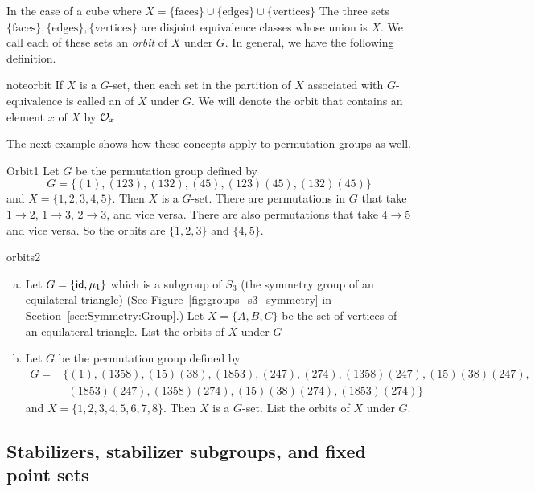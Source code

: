 In the case of a cube where $X=\{\text{faces}\}\cup\{\text{edges}\}\cup\{\text{vertices}\}$ The three sets $\{\text{faces}\},\{\text{edges}\},\{\text{vertices}\}$ are disjoint equivalence classes whose union is $X$. We call each of these sets an \emph{orbit} of $X$ under $G$.  In general, we have the following definition.

\begin{defn}{noteorbit}
If $X$ is a $G$-set, then each set in the partition of $X$ associated with
$G$-equivalence is called an  of $X$ under $G$. We will denote the orbit that contains an element $x$ of $X$ by
${\cal O}_x$. 
\end {defn}
The next example shows how these concepts apply to permutation groups as well.

\begin{example}{Orbit1}
Let $G$ be the permutation group defined by
\[
G =\{(1), (1 23), (1 3 2), (4 5), (1 2 3)(4 5), (1 3 2)(4 5) \}
\]
and $X = \{ 1, 2, 3, 4, 5\}$. Then $X$ is a $G$-set. There are permutations in $G$ that take $1\rightarrow2$, $1\rightarrow3$, $2\rightarrow3$, and vice versa. There are also permutations that take $4\rightarrow 5$ and vice versa.  So the orbits are $\{1, 2, 3\}$ and $\{4, 5\}$. 
\end{example} 
 
\begin{exercise}{orbits2}
\begin{enumerate}[(a)]
\item Let $G=\{\sf{id},\mu_1\}$ which is a subgroup of $S_3$ (the symmetry group of an equilateral triangle) (See Figure~\ref{fig:groups_s3_symmetry} in Section~\ref{sec:Symmetry:Group}.) Let $X=\{A,B,C\}$ be the set of vertices of an equilateral triangle. List the orbits of $X$ under $G$
\item Let $G$ be the permutation group defined by
\begin{align*}
G =&\{(1), (1358),(15)(38), (1853), (247),(274), (1358)(247),(15)(38)(247),\\
&~~ (1853)(247),(1358)(274),(15)(38)(274),(1853)(274) \}
\end{align*}
and $X = \{ 1, 2, 3, 4, 5,6,7,8\}$. Then $X$ is a $G$-set.  List the orbits of $X$ under $G$.
\end{enumerate}
\end {exercise}


\subsection{Stabilizers, stabilizer subgroups, and fixed point sets}
\label{subsec:GroupActions:SymmetryOfPolyhedra:Stabilizers}

